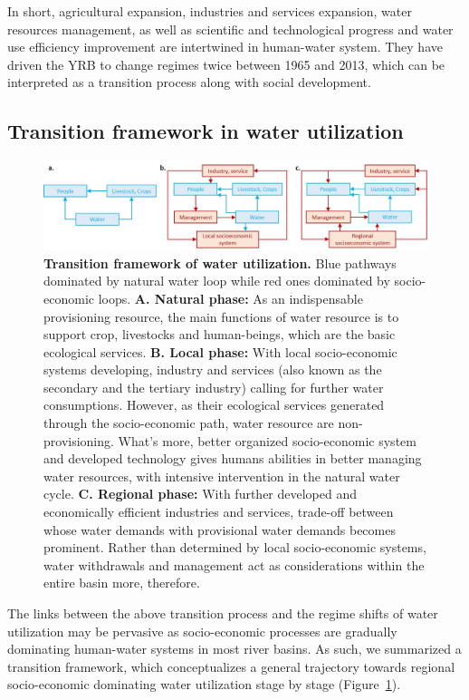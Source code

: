 \documentclass[9pt, twocolumn, twoside, lineno]{pnas-new}
\begin{document}
In short, agricultural expansion, industries and services expansion, water resources management, as well as scientific and technological progress and water use efficiency improvement are intertwined in human-water system. They have driven the YRB to change regimes twice between 1965 and 2013, which can be interpreted as a transition process along with social development.

\subsection*{Transition framework in water utilization}

\begin{figure}[th!]
	\centering
	\includegraphics[width=\linewidth]{../../figures/main/transition.jpg}
	\caption{
		\textbf{Transition framework of water utilization.} Blue pathways dominated by natural water loop while red ones dominated by socio-economic loops. 
		\textbf{A. Natural phase:} As an indispensable provisioning resource, the main functions of water resource is to support crop, livestocks and human-beings, which are the basic ecological services.
		\textbf{B. Local phase:} With local socio-economic systems developing, industry and services (also known as the secondary and the tertiary industry) calling for further water consumptions.
		However, as their ecological services generated through the socio-economic path, water resource are non-provisioning. What's more, better organized socio-economic system and developed technology gives humans abilities in better managing water resources, with intensive intervention in the natural water cycle. 
		\textbf{C. Regional phase:} With further developed and economically efficient industries and services, trade-off between whose water demands with provisional water demands becomes prominent. Rather than determined by local socio-economic systems, water withdrawals and management act as considerations within the entire basin more, therefore. 
	}
	\label{fig:summary}
\end{figure}

The links between the above transition process and the regime shifts of water utilization may be pervasive as socio-economic processes are gradually dominating human-water systems in most river basins.
As such, we summarized a transition framework, which conceptualizes a general trajectory towards regional socio-economic dominating water utilization stage by stage (Figure~\ref{fig:summary}).
\end{document}
